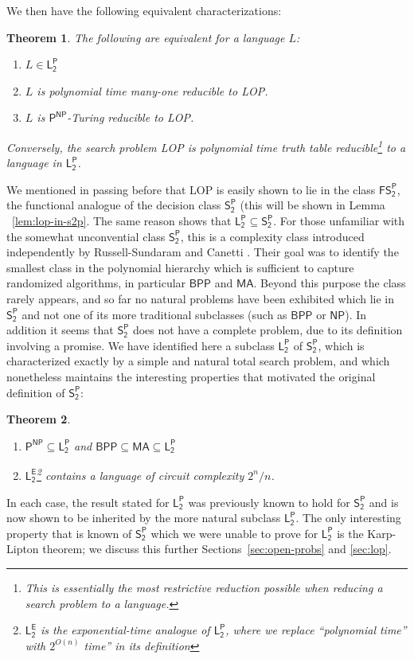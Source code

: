 \documentclass[11pt]{article}
\newtheorem{theorem}{Theorem}
\begin{document}
We then have the following equivalent characterizations:
\begin{theorem}\label{thm:l2p-complete-intro}
The following are equivalent for a language $L$:
\begin{enumerate}
    \item $L \in \mathsf{L_2^P}$
    \item $L$ is polynomial time many-one reducible to LOP.
    \item $L$ is $\mathsf{P^{NP}}
$-Turing reducible to LOP.
\end{enumerate}
Conversely, the search problem LOP is polynomial time truth table reducible\footnote{This is essentially the most restrictive reduction possible when reducing a search problem to a language.} to a language in $\mathsf{L_2^P}$.
\end{theorem}
We mentioned in passing before that LOP is easily shown to lie in the class $\mathsf{FS_2^P}$, the functional analogue of the decision class $\mathsf{S_2^P}$ (this will be shown in Lemma ~\ref{lem:lop-in-s2p}. The same reason shows that $\mathsf{L_2^P} \subseteq \mathsf{S_2^P}$. For those unfamiliar with the somewhat unconvential class $\mathsf{S_2^P}$, this is a complexity class introduced independently by Russell-Sundaram and Canetti \cite{russell-sundaram,canetti}. Their goal was to identify the smallest class in the polynomial hierarchy which is sufficient to capture randomized algorithms, in particular $\mathsf{BPP}$ and $\mathsf{MA}$. Beyond this purpose the class rarely appears, and so far no natural problems have been exhibited which lie in $\mathsf{S_2^P}$ and not one of its more traditional subclasses (such as $\mathsf{BPP}$ or $\mathsf{NP}$). In addition it seems that $\mathsf{S_2^P}$ does not have a complete problem, due to its definition involving a promise. We have identified here a subclass $\mathsf{L_2^P}$ of $\mathsf{S_2^P}$, which is characterized exactly by a simple and natural total search problem, and which nonetheless maintains the interesting properties that motivated the original definition of $\mathsf{S_2^P}$:
\begin{theorem}\label{thm:l2p-structural-intro}
\phantom\\
\begin{enumerate}
    \item $\mathsf{P^{NP}} \subseteq \mathsf{L_2^P}$ and $\mathsf{BPP} \subseteq \mathsf{MA} \subseteq \mathsf{L_2^P}$
    \item $\mathsf{L_2^E}$\footnote{$\mathsf{L_2^E}$ is the exponential-time analogue of $\mathsf{L_2^P}$, where we replace ``polynomial time'' with $2^{O(n)}$ time'' in its definition} contains a language of circuit complexity $2^n/n$.
\end{enumerate}
\end{theorem}
In each case, the result stated for $\mathsf{L_2^P}$ was previously known to hold for $\mathsf{S_2^P}$ and is now shown to be inherited by the more natural subclass $\mathsf{L_2^P}$. The only interesting property that is known of $\mathsf{S_2^P}$ which we were unable to prove for $\mathsf{L_2^P}$ is the Karp-Lipton theorem; we discuss this further Sections~\ref{sec:open-probs} and \ref{sec:lop}.
\end{document}
